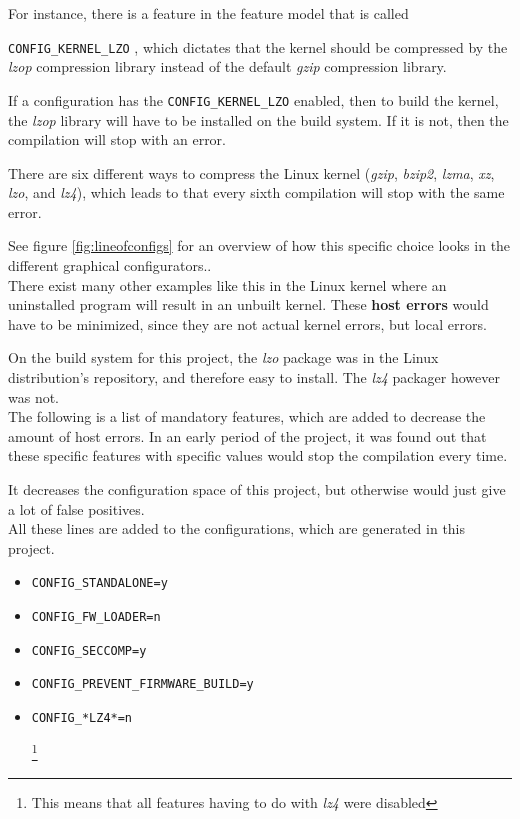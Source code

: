 \documentclass[a4paper,11pt]{report}
\newcommand{\textcode}[1]{
    \fboxsep=1pt
    \texttt{\colorbox{gray!20}{#1}}
}
\begin{document}
For instance, there is a feature in the feature model that is called 
\textcode{CONFIG\_KERNEL\_LZO}, which dictates that the kernel should be 
compressed by the \emph{lzop} compression library instead of the default 
\emph{gzip} compression library.

If a configuration has the \textcode{CONFIG\_KERNEL\_LZO} enabled, then to 
build the kernel, the \emph{lzop} library will have to be installed on the 
build system. If it is not, then the compilation will stop with an error.

There are six different ways to compress the Linux kernel (\emph{gzip}, 
\emph{bzip2}, \emph{lzma}, \emph{xz}, \emph{lzo}, and \emph{lz4}),
which leads to that every sixth compilation will stop with the same error.

See figure \ref{fig:lineofconfigs} for an overview of how this specific choice
looks in the different graphical configurators..
\\

There exist many other examples like this in the Linux kernel where an 
uninstalled program will result in an unbuilt kernel. These \textbf{host 
errors} would have to be minimized, since they are not actual kernel errors, 
but local errors. 

On the build system for this project, the \emph{lzo} package was in the Linux 
distribution's repository, and therefore easy to install. The \emph{lz4} 
packager however was not.
\\

The following is a list of mandatory features, which are added to decrease the 
amount of host errors. In an early period of the project, it was found out that 
these specific features with specific values would stop the compilation every 
time.

It decreases the configuration space of this project, but otherwise 
would just give a lot of false positives.
\\

All these lines are added to the configurations, which are generated in
this project.

\begin{itemize}
    \item \textcode{CONFIG\_STANDALONE=y}
    \item \textcode{CONFIG\_FW\_LOADER=n}
    \item \textcode{CONFIG\_SECCOMP=y}
    \item \textcode{CONFIG\_PREVENT\_FIRMWARE\_BUILD=y}
    \item \textcode{CONFIG\_*LZ4*=n}
        \footnote{This means that all features having to do with \emph{lz4} 
                    were disabled}
\end{itemize}
\end{document}
